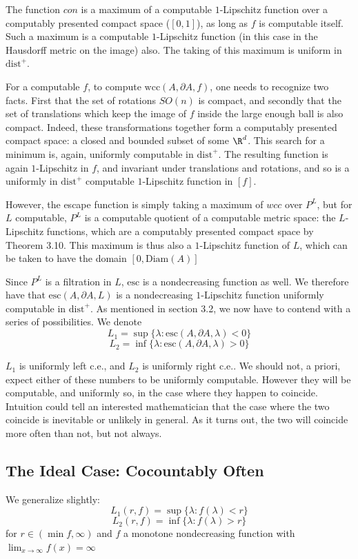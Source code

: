 \documentclass{journal}
\theoremstyle{definition}
\begin{document}
The function $con$ is a maximum of a computable $1$-Lipschitz function over a computably presented compact space ($[0,1]$), as long as $f$ is computable itself. Such a maximum is a computable $1$-Lipschitz function (in this case in the Hausdorff metric on the image) also. The taking of this maximum is uniform in $\mathrm{dist}^+$.

For a computable $f$, to compute $\mathrm{wcc}(A,\partial A, f)$, one needs to recognize two facts. First that the set of rotations $SO(n)$ is compact, and secondly that the set of translations which keep the image of $f$ inside the large enough ball is also compact. Indeed, these transformations together form a computably presented compact space: a closed and bounded subset of some $\R^d$. This search for a minimum is, again, uniformly computable  in $\mathrm{dist}^+$. The resulting function is again $1$-Lipschitz in $f$, and invariant under translations and rotations, and so is a uniformly in $\mathrm{dist}^+$ computable $1$-Lipschitz function in $[f]$.

However, the escape function is simply taking a maximum of $wcc$ over $P^L$, but for $L$ computable, $P^L$ is a computable quotient of a computable metric space: the $L$-Lipschitz functions, which are a computably presented compact space by Theorem 3.10. This maximum is thus also a $1$-Lipschitz function of $L$, which can be taken to have the domain $[0,\mathrm{Diam}(A)]$

Since $P^L$ is a filtration in $L$, $\mathrm{esc}$ is a nondecreasing function as well. We therefore have that $\mathrm{esc}(A,\partial A, L)$ is a nondecreasing $1$-Lipschitz function uniformly computable in $\mathrm{dist}^+$. As mentioned in section 3.2, we now have to contend with a series of possibilities. We denote 
$$L_1 = \sup\{\lambda: \mathrm{esc}(A,\partial A,\lambda) < 0\}$$
$$L_2 = \inf\{\lambda: \mathrm{esc}(A,\partial A,\lambda) > 0\}$$

$L_1$ is uniformly left c.e., and $L_2$ is uniformly right c.e.. We should not,  a priori, expect either of these numbers to be uniformly computable. However they will be computable, and uniformly so, in the case where they happen to coincide. Intuition could tell an interested mathematician that the case where the two coincide is inevitable or unlikely in general. As it turns out, the two will coincide more often than not, but not always.

\subsection{The Ideal Case: Cocountably Often}
We generalize slightly:
\label{sec:cocount}
$$L_1(r,f) = \sup\{\lambda: f(\lambda) < r\}$$
$$L_2(r,f) = \inf\{\lambda:f(\lambda) > r\}$$
for $r\in(\min f, \infty)$ and $f$ a monotone nondecreasing function with $\lim_{x\rightarrow \infty}f(x) = \infty$
\end{document}
